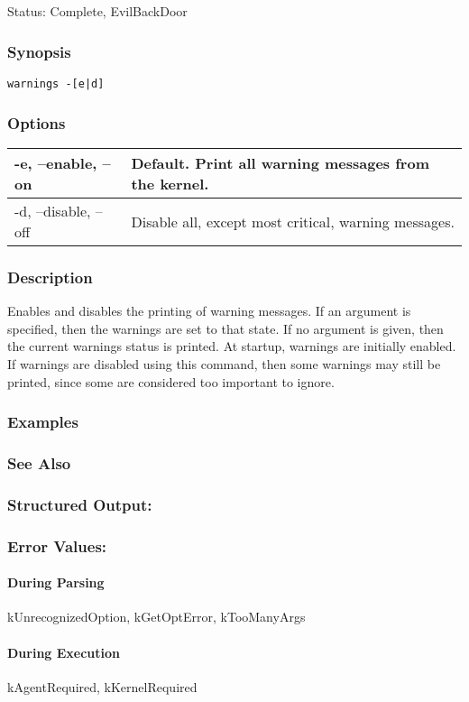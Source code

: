 \subsection{}
\label{warnings}
 Status: Complete, EvilBackDoor
\subsubsection*{Synopsis}
\begin{verbatim}
warnings -[e|d]
\end{verbatim}
\subsubsection*{Options}
\begin{tabular}{|l|l|}
\hline 
 -e, --enable, --on  & Default. Print all warning messages from the kernel.  \\
 \hline 
 -d, --disable, --off  & Disable all, except most critical, warning messages.  \\
 \hline 
\end{tabular}
\subsubsection*{Description}
 Enables and disables the printing of warning messages. If an argument is specified, then the warnings are set to that state. If no argument is given, then the current warnings status is printed. At startup, warnings are initially enabled. If warnings are disabled using this command, then some warnings may still be printed, since some are considered too important to ignore. 
\subsubsection*{Examples}
\subsubsection*{See Also}
\subsubsection*{Structured Output:}
\subsubsection*{Error Values:}
\paragraph*{During Parsing}
 kUnrecognizedOption, kGetOptError, kTooManyArgs
\paragraph*{During Execution}
 kAgentRequired, kKernelRequired

